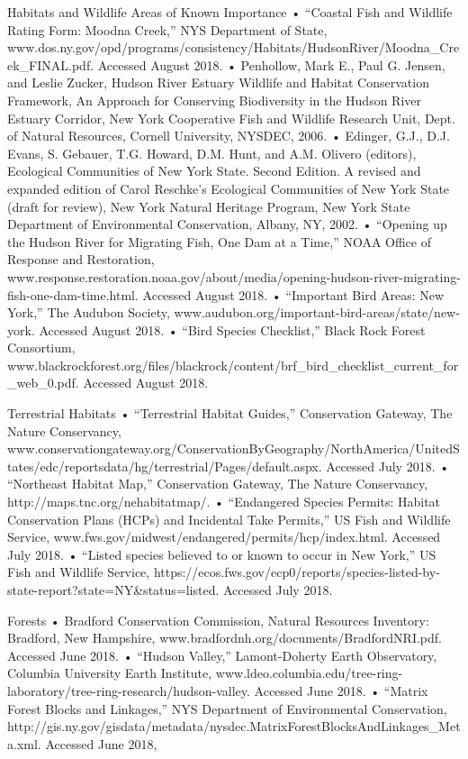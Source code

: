Habitats and Wildlife
	Areas of Known Importance
    • “Coastal Fish and Wildlife Rating Form: Moodna Creek,” NYS Department of State, www.dos.ny.gov/opd/programs/consistency/Habitats/HudsonRiver/Moodna_Creek_FINAL.pdf. Accessed August 2018.
    • Penhollow, Mark E., Paul G. Jensen, and Leslie Zucker, Hudson River Estuary Wildlife and Habitat Conservation Framework, An Approach for Conserving Biodiversity in the Hudson River Estuary Corridor, New York Cooperative Fish and Wildlife Research Unit, Dept. of Natural Resources, Cornell University, NYSDEC, 2006.
    • Edinger, G.J., D.J. Evans, S. Gebauer, T.G. Howard, D.M. Hunt, and A.M. Olivero (editors), Ecological Communities of New York State. Second Edition. A revised and expanded edition of Carol Reschke's Ecological Communities of New York State (draft for review), New York Natural Heritage Program, New York State Department of Environmental Conservation, Albany, NY, 2002.
    • “Opening up the Hudson River for Migrating Fish, One Dam at a Time,” NOAA Office of Response and Restoration, www.response.restoration.noaa.gov/about/media/opening-hudson-river-migrating-fish-one-dam-time.html. Accessed August 2018.
    • “Important Bird Areas: New York,” The Audubon Society, www.audubon.org/important-bird-areas/state/new-york. Accessed August 2018.
    • “Bird Species Checklist,” Black Rock Forest Consortium, www.blackrockforest.org/files/blackrock/content/brf_bird_checklist_current_for_web_0.pdf. Accessed August 2018.

Terrestrial Habitats
    • “Terrestrial Habitat Guides,” Conservation Gateway, The Nature Conservancy, www.conservationgateway.org/ConservationByGeography/NorthAmerica/UnitedStates/edc/reportsdata/hg/terrestrial/Pages/default.aspx. Accessed July 2018. 
    • “Northeast Habitat Map,” Conservation Gateway, The Nature Conservancy, http://maps.tnc.org/nehabitatmap/.
    • “Endangered Species Permits: Habitat Conservation Plans (HCPs) and Incidental Take Permits,” US Fish and Wildlife Service, www.fws.gov/midwest/endangered/permits/hcp/index.html. Accessed July 2018. 
    • “Listed species believed to or known to occur in New York,” US Fish and Wildlife Service, https://ecos.fws.gov/ecp0/reports/species-listed-by-state-report?state=NY&status=listed. Accessed July 2018. 

Forests
    • Bradford Conservation Commission, Natural Resources Inventory: Bradford, New Hampshire, www.bradfordnh.org/documents/BradfordNRI.pdf. Accessed June 2018. 
    • “Hudson Valley,” Lamont-Doherty Earth Observatory, Columbia University Earth Institute, www.ldeo.columbia.edu/tree-ring-laboratory/tree-ring-research/hudson-valley. Accessed June 2018.
    • “Matrix Forest Blocks and Linkages,” NYS Department of Environmental Conservation, http://gis.ny.gov/gisdata/metadata/nysdec.MatrixForestBlocksAndLinkages_Meta.xml. Accessed June 2018,

